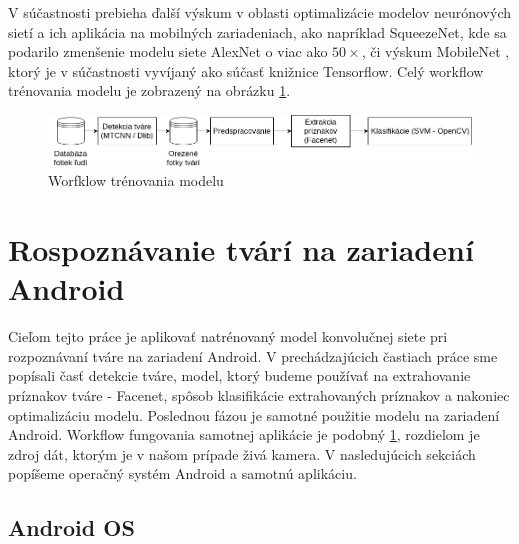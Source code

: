 \indent V súčastnosti prebieha ďalší výskum v oblasti optimalizácie modelov neurónových sietí a ich aplikácia na mobilných zariadeniach, ako napríklad SqueezeNet\cite{IandolaMAHDK16}, kde sa podarilo zmenšenie modelu siete AlexNet o viac ako $ 50 \times $, či výskum MobileNet \cite{HowardZCKWWAA17}, ktorý je v súčastnosti vyvíjaný ako súčasť knižnice Tensorflow. 
Celý workflow trénovania modelu je zobrazený na obrázku \ref{fig:trainig_workflow}.

\begin{figure}[H]
	\centering
	\includegraphics[width=1\linewidth]{img/trainig_workflow}
	\caption{Worfklow trénovania modelu}
	\label{fig:trainig_workflow}
\end{figure}

\newpage 

\section{Rospoznávanie tvárí na zariadení Android}
Cieľom tejto práce je aplikovať natrénovaný model konvolučnej siete pri rozpoznávaní tváre na zariadení Android.
V prechádzajúcich častiach práce sme popísali časť detekcie tváre, model, ktorý budeme používať na extrahovanie príznakov tváre - Facenet, spôsob klasifikácie extrahovaných príznakov a nakoniec optimalizáciu modelu.
Poslednou fázou je samotné použitie modelu na zariadení Android.
Workflow fungovania samotnej aplikácie je podobný \ref{fig:trainig_workflow}, rozdielom je zdroj dát, ktorým je v našom prípade živá kamera.
V nasledujúcich sekciách popíšeme operačný systém Android a samotnú aplikáciu.

\subsection{Android OS}

